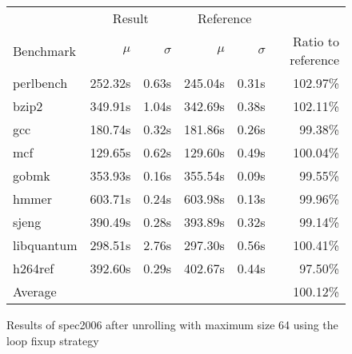 \begin{figure}[h]
    \begin{center}
        \begin{tabular}{lrrrrr}
            \toprule
            & \multicolumn{2}{c}{Result} & \multicolumn{2}{c}{Reference}\\
            Benchmark & $\mu$ & $\sigma$ & $\mu$ & $\sigma$ & Ratio to reference\\
            \midrule
            perlbench & 252.32s & 0.63s & 245.04s & 0.31s & 102.97\%\\
            bzip2 & 349.91s & 1.04s & 342.69s & 0.38s & 102.11\%\\
            gcc & 180.74s & 0.32s & 181.86s & 0.26s & 99.38\%\\
            mcf & 129.65s & 0.62s & 129.60s & 0.49s & 100.04\%\\
            gobmk & 353.93s & 0.16s & 355.54s & 0.09s & 99.55\%\\
            hmmer & 603.71s & 0.24s & 603.98s & 0.13s & 99.96\%\\
            sjeng & 390.49s & 0.28s & 393.89s & 0.32s & 99.14\%\\
            libquantum & 298.51s & 2.76s & 297.30s & 0.56s & 100.41\%\\
            h264ref & 392.60s & 0.29s & 402.67s & 0.44s & 97.50\%\\
            \midrule
            Average & & & & & 100.12\%\\
            \bottomrule
        \end{tabular}
    \end{center}
    \caption{Results of spec2006 after unrolling with maximum size 64 using the loop fixup strategy}
    \label{fig:eval:perf:loop:64}
\end{figure}
